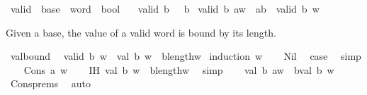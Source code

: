 \begin{isabellebody}
\isanewline
{}\isamarkupfalse%
\ valid\ {\isacharcolon}{\kern0pt}{\isacharcolon}{\kern0pt}\ {\isachardoublequoteopen}base\ {\isasymRightarrow}\ word\ {\isasymRightarrow}\ bool{\isachardoublequoteclose}\ \isanewline
\ \ {\isachardoublequoteopen}valid\ b\ {\isacharbrackleft}{\kern0pt}{\isacharbrackright}{\kern0pt}\ {\isasymlongleftrightarrow}\ {}{\isasymle}b{\isachardoublequoteclose}\isanewline
{\isacharbar}{\kern0pt}\ {\isachardoublequoteopen}valid\ b\ {\isacharparenleft}{\kern0pt}a{\isacharhash}{\kern0pt}w{\isacharparenright}{\kern0pt}\ {\isasymlongleftrightarrow}\ a{\isacharless}{\kern0pt}b\ {\isasymand}\ valid\ b\ w{\isachardoublequoteclose}%
\begin{isamarkuptext}%
Given a base, the value of a valid word is bound by its length.%
\end{isamarkuptext}\isamarkuptrue%
\isamarkupfalse%
\ val{\isacharunderscore}{\kern0pt}bound{\isacharcolon}{\kern0pt}\isanewline
\ \ {\isachardoublequoteopen}valid\ b\ w\ {\isasymLongrightarrow}\ val\ b\ w\ {\isacharless}{\kern0pt}\ b{\isacharcircum}{\kern0pt}length{\isacharparenleft}{\kern0pt}w{\isacharparenright}{\kern0pt}{\isachardoublequoteclose}\isanewline
%
\isadelimproof
%
\endisadelimproof
%
\isatagproof
{}\isamarkupfalse%
\ {\isacharparenleft}{\kern0pt}induction\ w{\isacharparenright}{\kern0pt}\isanewline
\ \ \isamarkupfalse%
\ Nil\ \isamarkupfalse%
\ {\isacharquery}{\kern0pt}case\ \isamarkupfalse%
\ simp\isanewline
{}\isamarkupfalse%
\isanewline
\ \ \isamarkupfalse%
\ {\isacharparenleft}{\kern0pt}Cons\ a\ w{\isacharparenright}{\kern0pt}\isanewline
\ \ \isamarkupfalse%
\ IH{\isacharcolon}{\kern0pt}\ {\isachardoublequoteopen}{}{\isacharplus}{\kern0pt}val\ b\ w\ {\isasymle}\ b{\isacharcircum}{\kern0pt}length{\isacharparenleft}{\kern0pt}w{\isacharparenright}{\kern0pt}{\isachardoublequoteclose}\ \isamarkupfalse%
\ simp\isanewline
\ \ \isamarkupfalse%
\ {\isachardoublequoteopen}val\ b\ {\isacharparenleft}{\kern0pt}a{\isacharhash}{\kern0pt}w{\isacharparenright}{\kern0pt}\ {\isacharless}{\kern0pt}\ b{\isacharasterisk}{\kern0pt}{\isacharparenleft}{\kern0pt}{}{\isacharplus}{\kern0pt}val\ b\ w{\isacharparenright}{\kern0pt}{\isachardoublequoteclose}\ \isamarkupfalse%
\ Cons{\isachardot}{\kern0pt}prems\ \isamarkupfalse%
\ auto\isanewline
\ \ \isamarkupfalse%
\ \isamarkupfalse%

\end{isabellebody}
